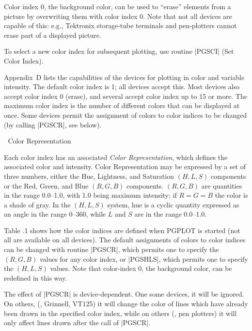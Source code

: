 Color index 0, the background color, can be used to ``erase'' elements
from a picture by overwriting them with color index 0.  Note that not 
all devices are capable of this: e.g., Tektronix storage-tube 
terminals and pen-plotters cannot erase part of a displayed picture.

To select a new color index for subsequent plotting, use routine |PGSCI|
(Set Color Index).

Appendix~D lists the capabilities of the devices for plotting in color
and variable intensity.  The default color index is 1; all devices
accept this.  Most devices also accept color index 0 (erase), and
several accept color index up to 15 or more. The maximum color index is
the number of different colors that can be displayed at once. Some
devices permit the assignment of colors to color indices to be changed
(by calling |PGSCR|, see below). 


\beginsection Color Representation

Each color index has an associated {\it Color Representation}, which
defines the associated color and intensity. Color Representation may
be expressed by a set of three numbers, either the Hue, Lightness, and
Saturation $(H,L,S)$ components or the Red, Green, and Blue $(R,G,B)$ 
components. $(R,G,B)$ are quantities in the range 0.0--1.0, with 1.0
being maximum intensity; if $R=G=B$ the color is a shade of gray. In the
$(H,L,S)$ system, hue is a cyclic quantity expressed as an angle in
the range 0--360, while $L$ and $S$ are in the range 0.0--1.0. 

Table \the\chapnum.1 shows how the color indices are defined
when PGPLOT is started (not all are available on all devices).
The default assignments of colors to color indices can be changed with
routine |PGSCR|, which permits one to specify the $(R,G,B)$ values for
any color index, or |PGSHLS|, which permits one to specify the $(H,L,S)$
values. Note that color-index 0, the background color, can be 
redefined in this way.

The effect of |PGSCR| is device-dependent. One some devices, it will be
ignored. On others, (\eg, Grinnell, VT125) it will change the color of
lines which have already been drawn in the specified color index, while
on others (\eg, pen plotters) it will only affect lines drawn after the
call of |PGSCR|. 

